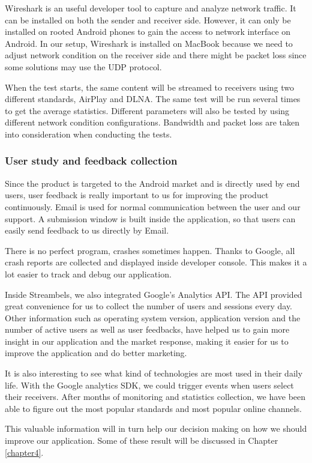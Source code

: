 Wireshark is an useful developer tool to capture and analyze network traffic.
It can be installed on both the sender and receiver side. However, it can only
be installed on rooted Android phones to gain the access to network interface
on Android. In our setup, Wireshark is installed on MacBook because we need to
adjust network condition on the receiver side and there might be packet loss
since some solutions may use the UDP protocol.

When the test starts, the same content will be streamed to receivers using two
different standards, AirPlay and DLNA. The same test will be run several times
to get the average statistics. Different parameters will also be tested by
using different network condition configurations. Bandwidth and packet loss are
taken into consideration when conducting the tests.
\subsubsection{User study and feedback collection\label{3_7_2}}
Since the product is targeted to the Android market and is directly used by end
users, user feedback is really important to us for improving the product
continuously. Email is used for normal communication between the user and our
support. A submission window is built inside the application, so that users can
easily send feedback to us directly by Email.

There is no perfect program, crashes sometimes happen. Thanks to Google, all
crash reports are collected and displayed inside developer console. This makes
it a lot easier to track and debug our application.

Inside Streambels, we also integrated Google's Analytics API. The API provided
great convenience for us to collect the number of users and sessions every day.
Other information such as operating system version, application version and the
number of active users as well as user feedbacks, have helped us to gain more
insight in our application and the market response, making it easier for us to
improve the application and do better marketing.

It is also interesting to see what kind of technologies are most used in their
daily life. With the Google analytics SDK, we could trigger events when users
select their receivers. After months of monitoring and statistics collection,
we have been able to figure out the most popular standards and most popular
online channels.

This valuable information will in turn help our decision making on how we should
improve our application. Some of these result will be discussed in Chapter
\ref{chapter4}.
